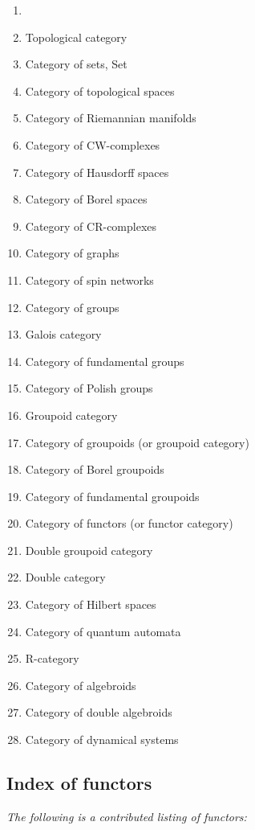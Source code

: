 \documentclass[12pt]{article}
\theoremstyle{plain}
\theoremstyle{definition}
\numberwithin{equation}{section}
\begin{document}
\begin{enumerate}
\item {}
\item Topological category
\item Category of sets, Set
\item Category of topological spaces
\item Category of Riemannian manifolds
\item Category of CW-complexes
\item Category of Hausdorff spaces
\item Category of Borel spaces
\item Category of CR-complexes
\item Category of graphs
\item Category of spin networks
\item Category of groups
\item Galois category
\item Category of fundamental groups
\item Category of Polish groups
\item Groupoid category
\item Category of groupoids (or groupoid category)
\item Category of Borel groupoids
\item Category of fundamental groupoids
\item Category of functors (or functor category)
\item Double groupoid category
\item Double category
\item Category of Hilbert spaces
\item Category of quantum automata
\item R-category
\item Category of algebroids
\item Category of double algebroids
\item Category of dynamical systems
\end{enumerate}

\subsection{Index of functors}
\emph{The following is a contributed listing of functors:}
\end{document}
